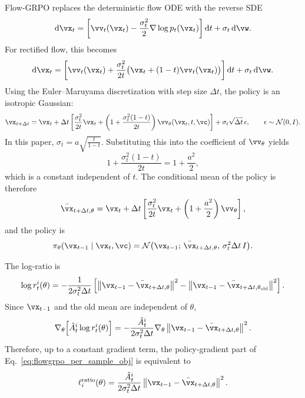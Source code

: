 \documentclass{article} %
\newcommand{\dd}{\mathrm{d}}
\begin{document}
Flow-GRPO replaces the deterministic flow ODE with the reverse SDE
\begin{equation}
\dd \vx_t
=
\left[
\vv_t(\vx_t)
-
\frac{\sigma_t^2}{2}\nabla\log p_t(\vx_t)
\right]\dd t
+
\sigma_t\,\dd \vw .
\end{equation}
For rectified flow, this becomes
\begin{equation}
\dd \vx_t
=
\left[
\vv_t(\vx_t)
+
\frac{\sigma_t^2}{2t}\bigl(\vx_t+(1-t)\vv_t(\vx_t)\bigr)
\right]\dd t
+
\sigma_t\,\dd \vw .
\end{equation}
Using the Euler--Maruyama discretization with step size $\Delta t$, the
policy is an isotropic Gaussian:
\begin{equation}
\label{eq:flowgrpo_update_rule}
\vx_{t+\Delta t}
=
\vx_t
+
\Delta t
\left[
\frac{\sigma_t^2}{2t}\vx_t
+
\left(1+\frac{\sigma_t^2(1-t)}{2t}\right)\vv_\theta(\vx_t,t,\vc)
\right]
+
\sigma_t\sqrt{\Delta t}\,\epsilon,
\qquad
\epsilon\sim\mathcal N(0,I).
\end{equation}
In this paper, \(\sigma_t = a\sqrt{\frac{t}{1-t}}\). Substituting this into
the coefficient of \(\vv_\theta\) yields
\[
1+\frac{\sigma_t^2(1-t)}{2t}
=
1+\frac{a^2}{2},
\]
which is a constant independent of \(t\). The conditional mean of the policy
is therefore
\begin{equation}
\bar{\vx}_{t+\Delta t,\theta}
=
\vx_t
+
\Delta t\left[
\frac{\sigma_t^2}{2t}\vx_t
+
\left(1+\frac{a^2}{2}\right)\vv_\theta
\right],
\end{equation}
and the policy is
\begin{equation}
\pi_\theta(\vx_{t-1}\mid \vx_t,\vc)
=
\mathcal N\bigl(\vx_{t-1};\,
\bar{\vx}_{t+\Delta t,\theta},\,
\sigma_t^2\Delta t\,I\bigr).
\end{equation}

The log-ratio is
\begin{equation}
\log r^i_t(\theta)
=
-\frac{1}{2\sigma_t^2\Delta t}
\left[
\left\|\vx_{t-1}-\bar{\vx}_{t+\Delta t,\theta}\right\|^2
-
\left\|\vx_{t-1}-\bar{\vx}_{t+\Delta t,\theta_{\mathrm{old}}}\right\|^2
\right].
\end{equation}
Since \(\vx_{t-1}\) and the old mean are independent of \(\theta\),
\begin{equation}
\nabla_\theta\!\left[\hat{A}^i_t\log r^i_t(\theta)\right]
=
-\frac{\hat{A}^i_t}{2\sigma_t^2\Delta t}
\nabla_\theta
\left\|\vx_{t-1}-\bar{\vx}_{t+\Delta t,\theta}\right\|^2 .
\end{equation}
Therefore, up to a constant gradient term, the policy-gradient part of
Eq.~\eqref{eq:flowgrpo_per_sample_obj} is equivalent to
\begin{equation}
\ell_i^{\mathrm{ratio}}(\theta)
=
\frac{\hat{A}^i_t}{2\sigma_t^2\Delta t}
\left\|\vx_{t-1}-\bar{\vx}_{t+\Delta t,\theta}\right\|^2 .
\end{equation}
\end{document}
